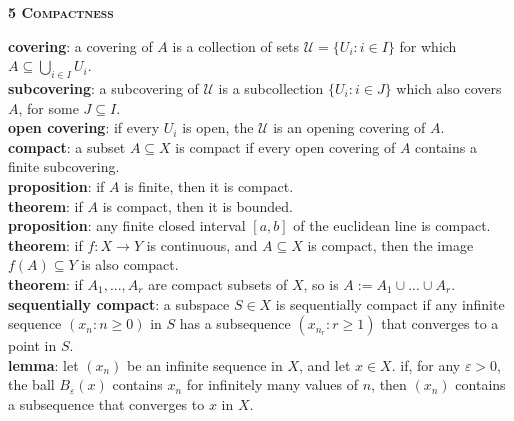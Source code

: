 \documentclass[a4paper]{article}
\begin{document}
\begin{framed}
	\begin{center}
		\textbf{\textsc{5 Compactness}}
	\end{center}
	\textbf{covering}: a covering of $A$ is a collection of sets $\mathcal{U} = \{U_i : i \in I\}$ for which $A \subseteq \bigcup_{i \in I} U_i$.\\
	
	\noindent
	\textbf{subcovering}: a subcovering of $\mathcal{U}$ is a subcollection $\{U_i : i \in J\}$ which also covers $A$, for some $J \subseteq I$.\\
	
	\noindent
	\textbf{open covering}: if every $U_i$ is open, the $\mathcal{U}$ is an opening covering of $A$.\\
	
	\noindent
	\textbf{compact}: a subset $A \subseteq X$ is compact if every open covering of $A$ contains a finite subcovering.\\
	
	\noindent
	\textbf{proposition}: if $A$ is finite, then it is compact.\\
	
	\noindent
	\textbf{theorem}: if $A$ is compact, then it is bounded.\\
	
	\noindent
	\textbf{proposition}: any finite closed interval $[a,b]$ of the euclidean line is compact.\\
	
	\noindent
	\textbf{theorem}: if $f: X \rightarrow Y$ is continuous, and $A \subseteq X$ is compact, then the image $f(A) \subseteq Y$ is also compact.\\
	
	\noindent
	\textbf{theorem}: if $A_1,...,A_r$ are compact subsets of $X$, so is $A := A_1 \cup ... \cup A_r$.\\
	
	\noindent
	\textbf{sequentially compact}: a subspace $S \in X$ is sequentially compact if any infinite sequence $(x_n : n \geq 0)$ in $S$ has a subsequence $(x_{n_r} : r \geq 1)$ that converges to a point in $S$.\\
	
	\noindent
	\textbf{lemma}: let $(x_n)$ be an infinite sequence in $X$, and let $x \in X$. if, for any $\varepsilon > 0$, the ball $B_\varepsilon(x)$ contains $x_n$ for infinitely many values of $n$, then $(x_n)$ contains a subsequence that converges to $x$ in $X$.\\
	

\end{framed}
\end{document}
